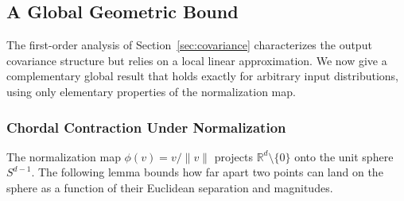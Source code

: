 %
%
%
%
%
%
%

\subsection{A Global Geometric Bound}
\label{sec:geometric-bound}

The first-order analysis of Section~\ref{sec:covariance} characterizes the
output covariance structure but relies on a local linear approximation.
We now give a complementary global result that holds exactly for arbitrary
input distributions, using only elementary properties of the normalization map.

\subsubsection{Chordal Contraction Under Normalization}

The normalization map $\phi(v) = v/\|v\|$ projects $\mathbb{R}^d \setminus \{0\}$
onto the unit sphere $S^{d-1}$.
The following lemma bounds how far apart two points can land on the sphere
as a function of their Euclidean separation and magnitudes.

